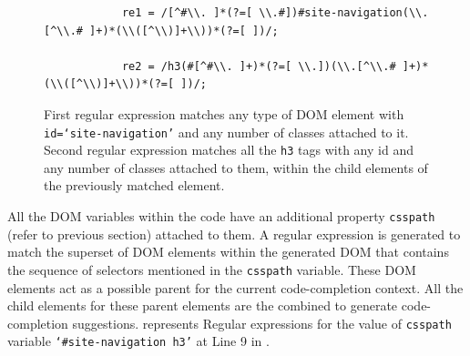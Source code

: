 					\begin{figure}
			\medskip
			\begin{lstlisting}
			re1 = /[^#\\. ]*(?=[ \\.#])#site-navigation(\\.[^\\.# ]+)*(\\([^\\)]+\\))*(?=[ ])/;
			
			re2 = /h3(#[^#\\. ]+)*(?=[ \\.])(\\.[^\\.# ]+)*(\\([^\\)]+\\))*(?=[ ])/;
			\end{lstlisting}
			\caption{First regular expression matches any type of DOM element with \texttt{id=`site-navigation'} and any number of classes attached to it. Second regular expression matches all the \texttt{h3} tags with any id and any number of classes attached to them, within the child elements of the previously matched element.}
			\label{Fig:RegExp}
			\end{figure}
			All the DOM variables within the \javascript code have an additional property \texttt{csspath} (refer to previous section) attached to them. A regular expression is generated to match the superset of DOM elements within the generated DOM that contains the sequence of \css selectors mentioned in the \texttt{csspath} variable. These DOM elements act as a possible parent for the current code-completion context. All the child elements for these parent elements are the combined to generate code-completion suggestions.  represents Regular expressions for the value of \texttt{csspath} variable \ie \texttt{`\#site-navigation h3'} at Line 9 in .
		
		